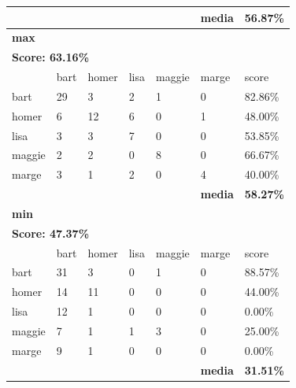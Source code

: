 \documentclass[journal]{IEEEtran}
\begin{document}
\begin{table}[!htb]
\begin{tabular}{l|l|l|l|l|l|l}
\textbf{} & \textbf{} & \textbf{} & \textbf{} & \textbf{} & \textbf{media} & \textbf{56.87\%} \\ \hline
\multicolumn{7}{l}{\textbf{max}}                                                            \\ \hline
\multicolumn{7}{l}{\textbf{Score: 63.16\%}}                                                 \\ \hline
          & bart      & homer     & lisa      & maggie    & marge          & score            \\ \hline
bart      & 29        & 3         & 2         & 1         & 0              & 82.86\%          \\ \hline
homer     & 6         & 12        & 6         & 0         & 1              & 48.00\%          \\ \hline
lisa      & 3         & 3         & 7         & 0         & 0              & 53.85\%          \\ \hline
maggie    & 2         & 2         & 0         & 8         & 0              & 66.67\%          \\ \hline
marge     & 3         & 1         & 2         & 0         & 4              & 40.00\%          \\ \hline
\textbf{} & \textbf{} & \textbf{} & \textbf{} & \textbf{} & \textbf{media} & \textbf{58.27\%} \\ \hline
\multicolumn{7}{l}{\textbf{min}}                                                            \\ \hline
\multicolumn{7}{l}{\textbf{Score: 47.37\%}}                                                 \\ \hline
          & bart      & homer     & lisa      & maggie    & marge          & score            \\ \hline
bart      & 31        & 3         & 0         & 1         & 0              & 88.57\%          \\ \hline
homer     & 14        & 11        & 0         & 0         & 0              & 44.00\%          \\ \hline
lisa      & 12        & 1         & 0         & 0         & 0              & 0.00\%           \\ \hline
maggie    & 7         & 1         & 1         & 3         & 0              & 25.00\%          \\ \hline
marge     & 9         & 1         & 0         & 0         & 0              & 0.00\%           \\ \hline
\textbf{} & \textbf{} & \textbf{} & \textbf{} & \textbf{} & \textbf{media} & \textbf{31.51\%} \\ \hline

\end{tabular}
\end{table}
\end{document}

